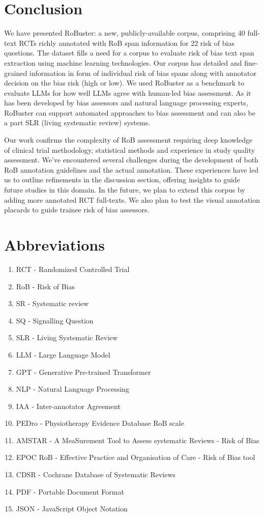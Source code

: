 \documentclass[sn-mathphys,Numbered]{sn-jnl}%
\theoremstyle{thmstyleone}%
\theoremstyle{thmstyletwo}%
\theoremstyle{thmstylethree}%
\begin{document}
%
%
%
\section{Conclusion}
\label{sec:conclusion}
%
We have presented RoBuster: a new, publicly-available corpus, comprising 40 full-text RCTs richly annotated with RoB span information for 22 risk of bias questions.
The dataset fills a need for a corpus to evaluate risk of bias text span extraction using machine learning technologies.
Our corpus has detailed and fine-grained information in form of individual risk of bias spans along with annotator decision on the bias risk (high or low).
We used RoBuster as a benchmark to evaluate LLMs for how well LLMs agree with human-led bias assessment.
As it has been developed by bias assessors and natural language processing experts, RoBuster can support automated approaches to bias assessment and can also be a part SLR (living systematic review) systems.


Our work confirms the complexity of RoB assessment requiring deep knowledge of clinical trial methodology, statistical methods and experience in study quality assessment.
We've encountered several challenges during the development of both RoB annotation guidelines and the actual annotation.
These experiences have led us to outline refinements in the discussion section, offering insights to guide future studies in this domain.
In the future, we plan to extend this corpus by adding more annotated RCT full-texts.
We also plan to test the visual annotation placards to guide trainee risk of bias assessors.
%
%
%
\section{Abbreviations}%
%
\begin{enumerate}
    \item RCT - Randomized Controlled Trial
    \item RoB - Risk of Bias
    \item SR - Systematic review
    \item SQ - Signalling Question
    \item SLR - Living Systematic Review
    \item LLM - Large Language Model
    \item GPT - Generative Pre-trained Transformer
    \item NLP - Natural Language Processing
    \item IAA - Inter-annotator Agreement
    \item PEDro - Physiotherapy Evidence Database RoB scale
    \item AMSTAR - A MeaSurement Tool to Assess systematic Reviews - Risk of Bias
    \item EPOC RoB - Effective Practice and Organisation of Care - Risk of Bias tool
    \item CDSR - Cochrane Database of Systematic Reviews
    \item PDF - Portable Document Format
    \item JSON - JavaScript Object Notation
\end{enumerate}
%
%
%
\backmatter
\end{document}
